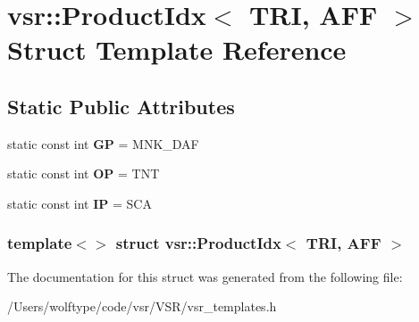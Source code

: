 \hypertarget{structvsr_1_1_product_idx_3_01_t_r_i_00_01_a_f_f_01_4}{\section{vsr\-:\-:Product\-Idx$<$ T\-R\-I, A\-F\-F $>$ Struct Template Reference}
\label{structvsr_1_1_product_idx_3_01_t_r_i_00_01_a_f_f_01_4}
}
\subsection*{Static Public Attributes}
\begin{DoxyCompactItemize}
\item 
\hypertarget{structvsr_1_1_product_idx_3_01_t_r_i_00_01_a_f_f_01_4_ab90465de200ead2d2cc830e4b5cbc412}{static const int {\bfseries G\-P} = M\-N\-K\-\_\-\-D\-A\-F}\label{structvsr_1_1_product_idx_3_01_t_r_i_00_01_a_f_f_01_4_ab90465de200ead2d2cc830e4b5cbc412}

\item 
\hypertarget{structvsr_1_1_product_idx_3_01_t_r_i_00_01_a_f_f_01_4_a029a438e492cfee6d6d76a984e7fb028}{static const int {\bfseries O\-P} = T\-N\-T}\label{structvsr_1_1_product_idx_3_01_t_r_i_00_01_a_f_f_01_4_a029a438e492cfee6d6d76a984e7fb028}

\item 
\hypertarget{structvsr_1_1_product_idx_3_01_t_r_i_00_01_a_f_f_01_4_a0fce5c61336ff87a9bf37ba0dd3b5229}{static const int {\bfseries I\-P} = S\-C\-A}\label{structvsr_1_1_product_idx_3_01_t_r_i_00_01_a_f_f_01_4_a0fce5c61336ff87a9bf37ba0dd3b5229}

\end{DoxyCompactItemize}
\subsubsection*{template$<$$>$ struct vsr\-::\-Product\-Idx$<$ T\-R\-I, A\-F\-F $>$}



The documentation for this struct was generated from the following file\-:\begin{DoxyCompactItemize}
\item 
/\-Users/wolftype/code/vsr/\-V\-S\-R/vsr\-\_\-templates.\-h\end{DoxyCompactItemize}
